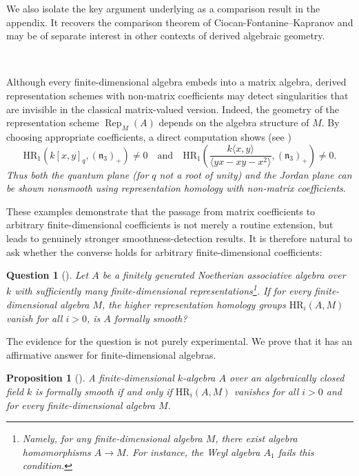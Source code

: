 \documentclass{article}
\numberwithin{equation}{section} %
\theoremstyle{plain}
\newtheorem*{prop}{Proposition}
\newtheorem*{ques}{Question}
\theoremstyle{definition}
\theoremstyle{remark}
\begin{document}
We also isolate the key argument underlying  as a comparison result in the appendix.
It recovers the comparison theorem of Ciocan-Fontanine--Kapranov and may be of separate interest in other contexts of derived algebraic geometry.

\

Although every finite-dimensional algebra embeds into a matrix algebra, derived representation schemes with non-matrix coefficients may detect singularities that are invisible in the classical matrix-valued version.
Indeed, the geometry of the representation scheme $\operatorname{Rep}_M(A)$ depends on the algebra structure of $M$.
By choosing appropriate coefficients, a direct computation shows (see )
\begin{equation*}
\mathrm{HR}_1(k[x,y]_q,(\mathfrak{n}_3)_+)\neq0\quad\text{and}\quad\mathrm{HR}_1\left(\frac{k\langle x,y\rangle}{\langle yx-xy-x^2\rangle},(\mathfrak{n}_3)_+\right)\neq0.
\end{equation*}
\emph{Thus both the quantum plane (for $q$ not a root of unity) and the Jordan plane can be shown nonsmooth using representation homology with non-matrix coefficients}.

These examples demonstrate that the passage from matrix coefficients to arbitrary finite-dimensional coefficients is not merely a routine extension, but leads to genuinely stronger smoothness-detection results.
It is therefore natural to ask whether the converse holds for arbitrary finite-dimensional coefficients:

\begin{ques}[]
Let $A$ be a finitely generated Noetherian associative algebra over $k$ with sufficiently many finite-dimensional representations\footnote{Namely, for any finite-dimensional algebra $M$, there exist algebra homomorphisms $A\to M$. For instance, the Weyl algebra $A_1$ fails this condition.}.
If for \emph{every} finite-dimensional algebra $M$, the higher representation homology groups $\mathrm{HR}_i(A,M)$ vanish for all $i>0$, is $A$ formally smooth?
\end{ques}

The evidence for the question is not purely experimental.
We prove that it has an affirmative answer for finite-dimensional algebras.

\begin{prop}[]
A finite-dimensional $k$-algebra $A$ over an algebraically closed field $k$ is formally smooth if and only if $\mathrm{HR}_i(A,M)$ vanishes for all $i>0$ and for every finite-dimensional algebra $M$.
\end{prop}
\end{document}
